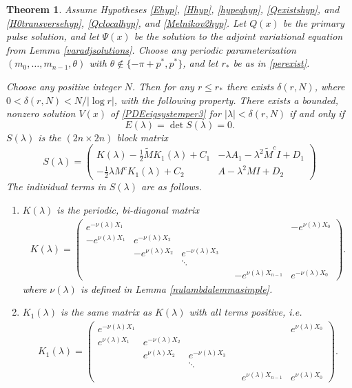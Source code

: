 \documentclass[11pt,reqno]{amsart}
\theoremstyle{plain}
\newtheorem{theorem}{Theorem}
\theoremstyle{definition}
\theoremstyle{remark}
\begin{document}
\begin{theorem}\label{blockmatrixtheorem}
Assume Hypotheses \ref{Ehyp}, \ref{Hhyp}, \ref{hypeqhyp}, \ref{Qexistshyp}, and \ref{H0transversehyp}, \ref{Qclocalhyp}, and \ref{Melnikov2hyp}. Let $Q(x)$ be the primary pulse solution, and let $\Psi(x)$ be the solution to the adjoint variational equation from Lemma \ref{varadjsolutions}. Choose any periodic parameterization $(m_0, \dots, m_{n-1}, \theta)$ with $\theta \notin \{-\pi + p^*, p^* \}$, and let $r_*$ be as in \cref{perexist}. 

Choose any positive integer $N$. Then for any $r \leq r_*$ there exists $\delta(r,N)$, where $0 < \delta(r,N) < N/|\log r|$, with the following property. There exists a bounded, nonzero solution $V(x)$ of \cref{PDEeigsystemper3} for $|\lambda| < \delta(r,N)$ if and only if
\begin{equation}\label{blockmatrixcond}
E(\lambda) = \det S(\lambda) = 0.
\end{equation}
$S(\lambda)$ is the $(2n \times 2n)$ block matrix
\begin{equation}\label{blockeq}
S(\lambda) = 
\begin{pmatrix}
K(\lambda) -\frac{1}{2} \tilde{M} K_1(\lambda) + C_1 & -\lambda A_1 - \lambda^2 \tilde{M}^c I + D_1 \\
-\frac{1}{2} \lambda M^c K_1(\lambda) + C_2 & A - \lambda^2 MI + D_2
\end{pmatrix}
\end{equation}
The individual terms in $S(\lambda)$ are as follows.

\begin{enumerate}
\item $K(\lambda)$ is the periodic, bi-diagonal matrix
\begin{align*}
K(\lambda) =  
\begin{pmatrix}
e^{-\nu(\lambda)X_1} & & & & & -e^{\nu(\lambda)X_0} \\
-e^{\nu(\lambda)X_1} & e^{-\nu(\lambda)X_2} \\
& -e^{\nu(\lambda)X_2} & e^{-\nu(\lambda)X_3} \\
  & & \ddots & && \\
& & & & -e^{\nu(\lambda)X_{n-1}} & e^{-\nu(\lambda)X_0}
\end{pmatrix}.
\end{align*}
where $\nu(\lambda)$ is defined in Lemma \ref{nulambdalemmasimple}.

\item $K_1(\lambda)$ is the same matrix as $K(\lambda)$ with all terms positive, i.e. 
\begin{align*}
K_1(\lambda) =  
\begin{pmatrix}
e^{-\nu(\lambda)X_1} & & & & & e^{\nu(\lambda)X_0} \\
e^{\nu(\lambda)X_1} & e^{-\nu(\lambda)X_2} \\
& e^{\nu(\lambda)X_2} & e^{-\nu(\lambda)X_3} \\
 & & \ddots & &&   \\
& & & & e^{\nu(\lambda)X_{n-1}} & e^{\nu(\lambda)X_0}
\end{pmatrix}.
\end{align*}


\end{enumerate}
\end{theorem}
\end{document}

